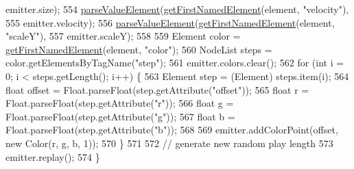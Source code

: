 \begin{DoxyCode}
      emitter.size);
554         \mbox{\hyperlink{classorg_1_1newdawn_1_1slick_1_1particles_1_1_particle_i_o_a82b077f0d91ea3410e75e03e1d559a6b}{parseValueElement}}(\mbox{\hyperlink{classorg_1_1newdawn_1_1slick_1_1particles_1_1_particle_i_o_a84405f6266ad1512ddbd9939dd73e02f}{getFirstNamedElement}}(element, \textcolor{stringliteral}{"velocity"}),
555                 emitter.velocity);
556         \mbox{\hyperlink{classorg_1_1newdawn_1_1slick_1_1particles_1_1_particle_i_o_a82b077f0d91ea3410e75e03e1d559a6b}{parseValueElement}}(\mbox{\hyperlink{classorg_1_1newdawn_1_1slick_1_1particles_1_1_particle_i_o_a84405f6266ad1512ddbd9939dd73e02f}{getFirstNamedElement}}(element, \textcolor{stringliteral}{"scaleY"}),
557                 emitter.scaleY);
558 
559         Element color = \mbox{\hyperlink{classorg_1_1newdawn_1_1slick_1_1particles_1_1_particle_i_o_a84405f6266ad1512ddbd9939dd73e02f}{getFirstNamedElement}}(element, \textcolor{stringliteral}{"color"});
560         NodeList steps = color.getElementsByTagName(\textcolor{stringliteral}{"step"});
561         emitter.colors.clear();
562         \textcolor{keywordflow}{for} (\textcolor{keywordtype}{int} i = 0; i < steps.getLength(); i++) \{
563             Element step = (Element) steps.item(i);
564             \textcolor{keywordtype}{float} offset = Float.parseFloat(step.getAttribute(\textcolor{stringliteral}{"offset"}));
565             \textcolor{keywordtype}{float} r = Float.parseFloat(step.getAttribute(\textcolor{stringliteral}{"r"}));
566             \textcolor{keywordtype}{float} g = Float.parseFloat(step.getAttribute(\textcolor{stringliteral}{"g"}));
567             \textcolor{keywordtype}{float} b = Float.parseFloat(step.getAttribute(\textcolor{stringliteral}{"b"}));
568 
569             emitter.addColorPoint(offset, \textcolor{keyword}{new} Color(r, g, b, 1));
570         \}
571 
572         \textcolor{comment}{// generate new random play length}
573         emitter.replay();
574     \}
\end{DoxyCode}
\mbox{\label{classorg_1_1newdawn_1_1slick_1_1particles_1_1_particle_i_o_af9519582cb522c103cc0a829fb3e8413}} 
